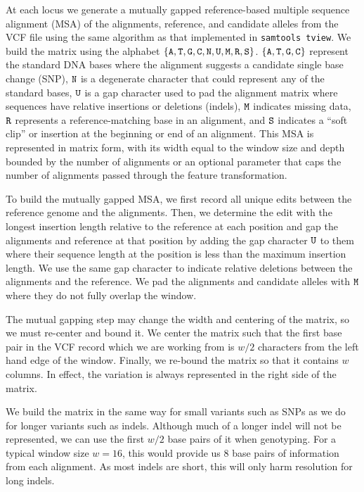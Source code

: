 \documentclass{article}
\begin{document}
At each locus we generate a mutually gapped reference-based multiple sequence alignment (MSA) of the alignments, reference, and candidate alleles from the VCF file using the same algorithm as that implemented in {\tt samtools tview}.
We build the matrix using the alphabet $\{ {\tt A, T, G, C, N, U, M, R, S} \}$.
$\{ {\tt A, T, G, C} \}$ represent the standard DNA bases where the alignment suggests a candidate single base change (SNP), ${\tt N}$ is a degenerate character that could represent any of the standard bases, ${\tt U}$ is a gap character used to pad the alignment matrix where sequences have relative insertions or deletions (indels), ${\tt M }$ indicates missing data, ${\tt R}$ represents a reference-matching base in an alignment, and ${\tt S}$ indicates a ``soft clip'' or insertion at the beginning or end of an alignment.
This MSA is represented in matrix form, with its width equal to the window size and depth bounded by the number of alignments or an optional parameter that caps the number of alignments passed through the feature transformation.

To build the mutually gapped MSA, we first record all unique edits between the reference genome and the alignments.
Then, we determine the edit with the longest insertion length relative to the reference at each position and gap the alignments and reference at that position by adding the gap character ${\tt U}$ to them where their sequence length at the position is less than the maximum insertion length.
We use the same gap character to indicate relative deletions between the alignments and the reference.
We pad the alignments and candidate alleles with ${\tt M}$ where they do not fully overlap the window.

The mutual gapping step may change the width and centering of the matrix, so we must re-center and bound it.
We center the matrix such that the first base pair in the VCF record which we are working from is $w/2$ characters from the left hand edge of the window.
Finally, we re-bound the matrix so that it contains $w$ columns.
In effect, the variation is always represented in the right side of the matrix.

We build the matrix in the same way for small variants such as SNPs as we do for longer variants such as indels.
Although much of a longer indel will not be represented, we can use the first $w/2$ base pairs of it when genotyping.
For a typical window size $w = 16$, this would provide us 8 base pairs of information from each alignment.
As most indels are short, this will only harm resolution for long indels.
\end{document}
